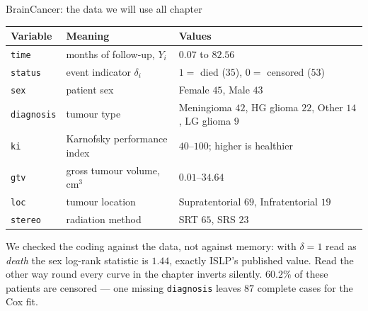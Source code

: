\documentclass[aspectratio=169,11pt]{beamer}
\begin{document}
\begin{frame}{BrainCancer: the data we will use all chapter}
  \footnotesize
  \begin{center}
  \begin{tabular}{@{}lll@{}}
    \toprule
    \textbf{Variable} & \textbf{Meaning} & \textbf{Values} \\
    \midrule
    \texttt{time}      & months of follow-up, $Y_i$ & $0.07$ to $82.56$ \\
    \texttt{status}    & event indicator $\delta_i$ & $1=$ died ($35$), $0=$ censored ($53$) \\
    \texttt{sex}       & patient sex & Female $45$, Male $43$ \\
    \texttt{diagnosis} & tumour type & Meningioma $42$, HG glioma $22$, Other $14$, LG glioma $9$ \\
    \texttt{ki}        & Karnofsky performance index & $40$--$100$; higher is healthier \\
    \texttt{gtv}       & gross tumour volume, cm$^3$ & $0.01$--$34.64$ \\
    \texttt{loc}       & tumour location & Supratentorial $69$, Infratentorial $19$ \\
    \texttt{stereo}    & radiation method & SRT $65$, SRS $23$ \\
    \bottomrule
  \end{tabular}
  \end{center}
  \begin{mistake}
    We checked the coding against the data, not against memory: with $\delta=1$ read as
    \emph{death} the sex log-rank statistic is $1.44$, exactly ISLP's published value.
    Read the other way round every curve in the chapter inverts silently. $60.2\%$ of
    these patients are censored --- one missing \texttt{diagnosis} leaves $87$ complete
    cases for the Cox fit.
  \end{mistake}
\end{frame}
\end{document}
